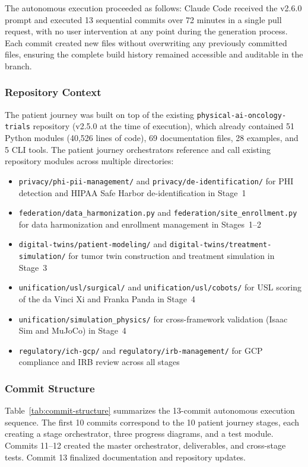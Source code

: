 \documentclass{article}
\begin{document}
The autonomous execution proceeded as follows: Claude Code received the v2.6.0 prompt and executed 13 sequential commits over 72 minutes in a single pull request, with no user intervention at any point during the generation process. Each commit created new files without overwriting any previously committed files, ensuring the complete build history remained accessible and auditable in the branch.

\subsubsection{Repository Context}

The patient journey was built on top of the existing \texttt{physical-ai-oncology-trials} repository (v2.5.0 at the time of execution), which already contained 51 Python modules (40,526 lines of code), 69 documentation files, 28 examples, and 5 CLI tools. The patient journey orchestrators reference and call existing repository modules across multiple directories:

\begin{itemize}[leftmargin=*]
\item \texttt{privacy/phi-pii-management/} and \texttt{privacy/de-identification/} for PHI detection and HIPAA Safe Harbor de-identification in Stage~1
\item \texttt{federation/data\_harmonization.py} and \texttt{federation/site\_enrollment.py} for data harmonization and enrollment management in Stages~1--2
\item \texttt{digital-twins/patient-modeling/} and \texttt{digital-twins/treatment-simulation/} for tumor twin construction and treatment simulation in Stage~3
\item \texttt{unification/usl/surgical/} and \texttt{unification/usl/cobots/} for USL scoring of the da Vinci Xi and Franka Panda in Stage~4
\item \texttt{unification/simulation\_physics/} for cross-framework validation (Isaac Sim and MuJoCo) in Stage~4
\item \texttt{regulatory/ich-gcp/} and \texttt{regulatory/irb-management/} for GCP compliance and IRB review across all stages
\end{itemize}

\subsubsection{Commit Structure}

Table~\ref{tab:commit-structure} summarizes the 13-commit autonomous execution sequence. The first 10 commits correspond to the 10 patient journey stages, each creating a stage orchestrator, three progress diagrams, and a test module. Commits 11--12 created the master orchestrator, deliverables, and cross-stage tests. Commit 13 finalized documentation and repository updates.
\end{document}
